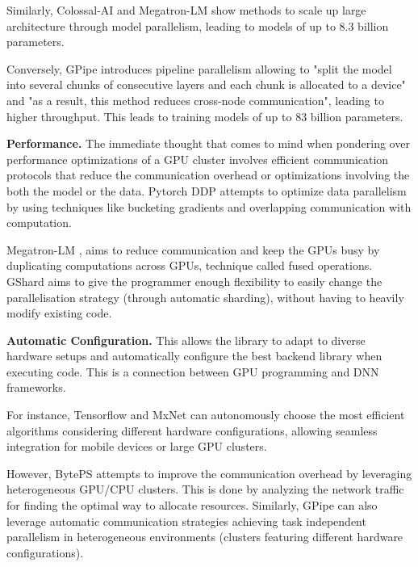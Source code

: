 Similarly, Colossal-AI \cite{li_colossal-ai_2023} and Megatron-LM \cite{shoeybi_megatron-lm_2020}
show methods to scale up large architecture through model parallelism, leading to models of up to
8.3 billion parameters.

Conversely, GPipe \cite{huang_gpipe_2019} introduces pipeline parallelism allowing to "split the
model into several chunks of consecutive layers and each chunk is allocated to a device" and "as a
result, this method reduces cross-node communication", leading to higher throughput. This leads to
training models of up to 83 billion parameters.

\textbf{Performance.}
The immediate thought that comes to mind when pondering over performance optimizations of a GPU cluster involves
efficient communication protocols that reduce the communication overhead or optimizations involving the
both the model or the data. Pytorch DDP \cite{li_pytorch_2020} attempts to optimize data parallelism by
using techniques like bucketing gradients and overlapping communication with computation.

Megatron-LM \cite{shoeybi_megatron-lm_2020}, aims to reduce communication and keep the GPUs busy by
duplicating computations across GPUs, technique called fused operations. GShard
\cite{lepikhin_gshard_2020} aims to give the programmer enough flexibility to easily change the
parallelisation strategy (through automatic sharding), without having to heavily modify existing
code.

\textbf{Automatic Configuration.}
This allows the library to adapt to diverse hardware setups and automatically configure the best
backend library when executing code. This is a connection between GPU programming and DNN frameworks.

For instance, Tensorflow \cite{abadi_tensorflow_2016} and MxNet \cite{chen_mxnet_2015} can
autonomously choose the most efficient algorithms considering different hardware configurations,
allowing seamless integration for mobile devices or large GPU clusters.

However, BytePS \cite{jiang_unified_nodate} attempts to improve the communication overhead by
leveraging heterogeneous GPU/CPU clusters. This is done by analyzing the network traffic for
finding the optimal way to allocate resources. Similarly, GPipe \cite{huang_gpipe_2019} can also
leverage automatic communication strategies achieving task independent parallelism in heterogeneous
environments (clusters featuring different hardware configurations).

